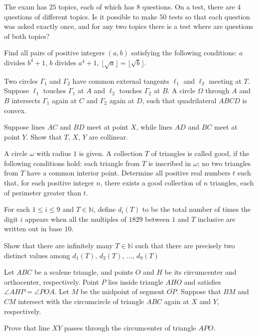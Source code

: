 \documentclass[11pt]{scrartcl}
\begin{document}
\begin{problem}[5101270312905584526]
The exam has $25$ topics, each of which has $8$ questions. On a test, there are $4$ questions of different topics.
Is it possible to make $50$ tests so that each question was asked exactly once, and for any two topics there is a test where are questions of both topics?
\end{problem}
\begin{problem}[600298381529685]
	Find all pairs of positive integers $(a,b)$ satisfying the following conditions:
$a$ divides $b^4+1$,
$b$ divides $a^4+1$,
$\lfloor\sqrt{a}\rfloor=\lfloor \sqrt{b}\rfloor$.
\end{problem}
\begin{problem}[945532205287762]
Two circles $\Gamma_1$ and $\Gamma_2$ have common external tangents $\ell_1$ and $\ell_2$ meeting at $T$. Suppose $\ell_1$ touches $\Gamma_1$ at $A$ and $\ell_2$ touches $\Gamma_2$ at $B$. A circle $\Omega$ through $A$ and $B$ intersects $\Gamma_1$ again at $C$ and $\Gamma_2$ again at $D$, such that quadrilateral $ABCD$ is convex.

Suppose lines $AC$ and $BD$ meet at point $X$, while lines $AD$ and $BC$ meet at point $Y$. Show that $T$, $X$, $Y$ are collinear.
\end{problem}
\begin{problem}[2265193939454652363]
	A circle $\omega$ with radius $1$ is given. A collection $T$ of triangles is called good, if the following conditions hold:
each triangle from $T$ is inscribed in $\omega$;
no two triangles from $T$ have a common interior point.
Determine all positive real numbers $t$ such that, for each positive integer $n$, there exists a good collection of $n$ triangles, each of perimeter greater than $t$.
\end{problem}
\begin{problem}[526922799283626]
	For each $1\leq i\leq 9$ and $T\in\mathbb N$, define $d_i(T)$ to be the total number of times the digit $i$ appears when all the multiples of $1829$ between $1$ and $T$ inclusive are written out in base $10$.

Show that there are infinitely many $T\in\mathbb N$ such that there are precisely two distinct values among $d_1(T)$, $d_2(T)$, $\dots$, $d_9(T)$
\end{problem}
\begin{problem}[8053761138620448460]
	Let $ABC$ be a scalene triangle, and points $O$ and $H$ be its circumcenter and orthocenter, respectively. Point $P$ lies inside triangle $AHO$ and satisfies $\angle AHP = \angle POA$. Let $M$ be the midpoint of segment $\overline{OP}$. Suppose that $BM$ and $CM$ intersect with the circumcircle of triangle $ABC$ again at $X$ and $Y$, respectively.

Prove that line $XY$ passes through the circumcenter of triangle $APO$.
\end{problem}
\end{document}
